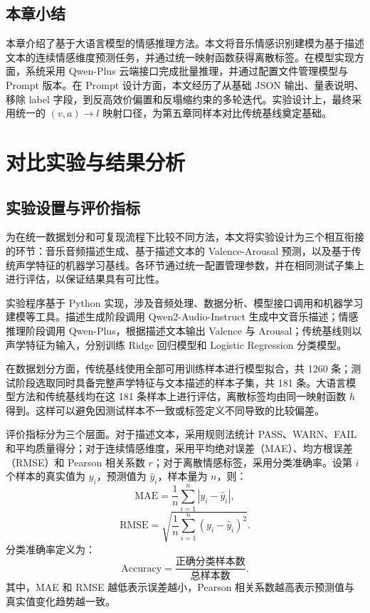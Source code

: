 \subsection{本章小结}

本章介绍了基于大语言模型的情感推理方法。本文将音乐情感识别建模为基于描述文本的连续情感维度预测任务，并通过统一映射函数获得离散标签。在模型实现方面，系统采用 Qwen-Plus 云端接口完成批量推理，并通过配置文件管理模型与 Prompt 版本。在 Prompt 设计方面，本文经历了从基础 JSON 输出、量表说明、移除 label 字段，到反高效价偏置和反塌缩约束的多轮迭代。实验设计上，最终采用统一的 $(v,a)\rightarrow l$ 映射口径，为第五章同样本对比传统基线奠定基础。

\newpage

\section{对比实验与结果分析}

\subsection{实验设置与评价指标}

为在统一数据划分和可复现流程下比较不同方法，本文将实验设计为三个相互衔接的环节：音乐音频描述生成、基于描述文本的 Valence-Arousal 预测，以及基于传统声学特征的机器学习基线。各环节通过统一配置管理参数，并在相同测试子集上进行评估，以保证结果具有可比性。

实验程序基于 Python 实现，涉及音频处理、数据分析、模型接口调用和机器学习建模等工具。描述生成阶段调用 Qwen2-Audio-Instruct 生成中文音乐描述；情感推理阶段调用 Qwen-Plus，根据描述文本输出 Valence 与 Arousal；传统基线则以声学特征为输入，分别训练 Ridge 回归模型和 Logistic Regression 分类模型。

在数据划分方面，传统基线使用全部可用训练样本进行模型拟合，共 1260 条；测试阶段选取同时具备完整声学特征与文本描述的样本子集，共 181 条。大语言模型方法和传统基线均在这 181 条样本上进行评估，离散标签均由同一映射函数 $h$ 得到。这样可以避免因测试样本不一致或标签定义不同导致的比较偏差。

评价指标分为三个层面。对于描述文本，采用规则法统计 PASS、WARN、FAIL 和平均质量得分；对于连续情感维度，采用平均绝对误差（MAE）、均方根误差（RMSE）和 Pearson 相关系数 $r$；对于离散情感标签，采用分类准确率。设第 $i$ 个样本的真实值为 $y_i$，预测值为 $\hat{y}_i$，样本量为 $n$，则：
\begin{equation}
\mathrm{MAE}=\frac{1}{n}\sum_{i=1}^{n}|y_i-\hat{y}_i|,
\end{equation}
\begin{equation}
\mathrm{RMSE}=\sqrt{\frac{1}{n}\sum_{i=1}^{n}(y_i-\hat{y}_i)^2}.
\end{equation}
分类准确率定义为：
\begin{equation}
\mathrm{Accuracy}=\frac{\text{正确分类样本数}}{\text{总样本数}}.
\end{equation}
其中，MAE 和 RMSE 越低表示误差越小，Pearson 相关系数越高表示预测值与真实值变化趋势越一致。

